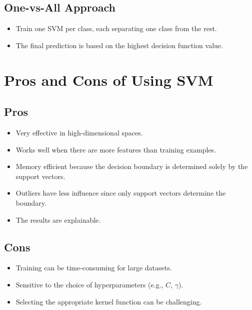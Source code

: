 \documentclass[10pt]{article}
\begin{document}
\subsection{One-vs-All Approach}
\begin{itemize}
    \item Train one SVM per class, each separating one class from the rest.
    \item The final prediction is based on the highest decision function value.
\end{itemize}

\section{Pros and Cons of Using SVM}

\subsection{Pros}
\begin{itemize}
    \item Very effective in high-dimensional spaces.
    \item Works well when there are more features than training examples.
    \item Memory efficient because the decision boundary is determined solely by the support vectors.
    \item Outliers have less influence since only support vectors determine the boundary.
    \item The results are explainable.
\end{itemize}

\subsection{Cons}
\begin{itemize}
    \item Training can be time-consuming for large datasets.
    \item Sensitive to the choice of hyperparameters (e.g., \(C\), \(\gamma\)).
    \item Selecting the appropriate kernel function can be challenging.
\end{itemize}
\end{document}
